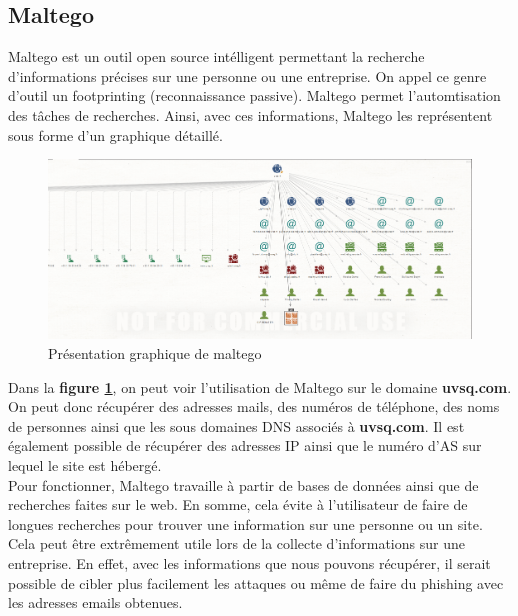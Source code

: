 \subsection{Maltego}

Maltego est un outil open source intélligent permettant la recherche d'informations précises sur une personne ou une entreprise. On appel ce genre d'outil un footprinting (reconnaissance passive). Maltego permet l'automtisation des tâches de recherches. Ainsi, avec ces informations, Maltego les représentent sous forme d'un graphique détaillé.\\

\begin{figure}[htp!]
  \centering
  \setlength\figureheight{7cm}
  \setlength\figurewidth{9cm}
  \includegraphics[width=1\textwidth]{oui/images/maltego/uvsq2.PNG}
  \caption{Présentation graphique de maltego}
  \label{fig:graphmaltego}
\end{figure}

\newpage
Dans la \textbf{figure \ref{fig:graphmaltego}}, on peut voir l'utilisation de Maltego sur le domaine \textbf{uvsq.com}. On peut donc récupérer des adresses mails, des numéros de téléphone, des noms de personnes ainsi que les sous domaines DNS associés à \textbf{uvsq.com}. Il est également possible de récupérer des adresses IP ainsi que le numéro d'AS sur lequel le site est hébergé.\\

Pour fonctionner, Maltego travaille à partir de bases de données ainsi que de recherches faites sur le web. En somme, cela évite à l'utilisateur de faire de longues recherches pour trouver une information sur une personne ou un site. Cela peut être extrêmement utile lors de la collecte d'informations sur une entreprise. En effet, avec les informations que nous pouvons récupérer, il serait possible de cibler plus facilement les attaques ou même de faire du phishing avec les adresses emails obtenues.
%

